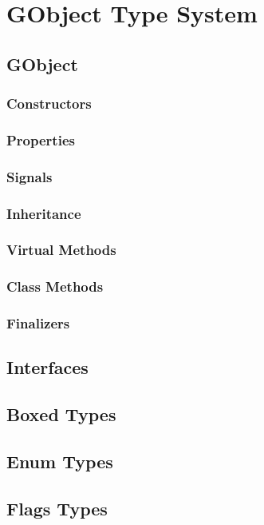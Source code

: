 \chapter{GObject Type System}

\section{GObject}
\subsection{Constructors}
\subsection{Properties}
\subsection{Signals}
\subsection{Inheritance}
\subsection{Virtual Methods}
\subsection{Class Methods}
\subsection{Finalizers}

\section{Interfaces}
\section{Boxed Types}
\section{Enum Types}
\section{Flags Types}
